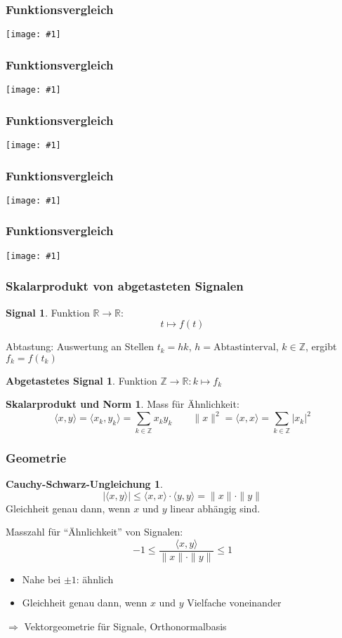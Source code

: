 %
%
%



\theoremstyle{definition}
\newtheorem{signal}{Signal}
\newtheorem{abgetastet}{Abgetastetes Signal}
\newtheorem{skalar}{Skalarprodukt und Norm}
\newtheorem{cauchyschwarz}{Cauchy-Schwarz-Ungleichung}
\newtheorem{nachteile}{Nachteile}
\newtheorem{idee}{Idee}
\newtheorem{faktoren}{Erfolgsfaktoren}


%
%
\def\vergleich#1{
\begin{frame}
\frametitle{Funktionsvergleich}
\centering
\texttt{[image: \#1]}
\end{frame}
}

\vergleich{../../buch/chapters/1-geometrie/images/sinsin.pdf}
\vergleich{../../buch/chapters/1-geometrie/images/sincos.pdf}
\vergleich{../../buch/chapters/1-geometrie/images/sinrect.pdf}
\vergleich{../../buch/chapters/1-geometrie/images/cosrect.pdf}
\vergleich{../../buch/chapters/1-geometrie/images/sinrand.pdf}

\begin{frame}
\frametitle{Skalarprodukt von abgetasteten Signalen}
\begin{signal}
Funktion $\mathbb R \to \mathbb R$:
\[
t\mapsto f(t)
\]
\end{signal}

Abtastung: Auswertung an Stellen $t_k = hk$, $h=\text{Abtastinterval}$,
$k\in\mathbb Z$, ergibt $f_k=f(t_k)$

\begin{abgetastet}
Funktion $\mathbb Z\to \mathbb R: k\mapsto f_k $
\end{abgetastet}

\begin{skalar}
Mass für Ähnlichkeit:
\[
\langle x,y\rangle
=
\langle x_k, y_k \rangle
=
\sum_{k\in\mathbb Z} x_ky_k
\qquad
\|x\|^2 = \langle x,x\rangle = \sum_{k\in\mathbb Z} |x_k|^2
\]
\end{skalar}

\end{frame}

%
%
\begin{frame}
\frametitle{Geometrie}
\begin{cauchyschwarz}
\[
|\langle x,y\rangle| \le \langle x,x\rangle \cdot \langle y,y\rangle
= \|x\|\cdot \|y\|
\]
Gleichheit genau dann, wenn $x$ und $y$ linear abhängig sind.
\end{cauchyschwarz}
Masszahl für ``Ähnlichkeit'' von Signalen:
\[
-1 \le \frac{\langle x,y\rangle}{\|x\|\cdot \|y\|}\le 1
\]
\begin{itemize}
\item
Nahe bei $\pm 1$: ähnlich
\item
Gleichheit genau dann, wenn $x$ und $y$ Vielfache voneinander
\end{itemize}
$\Rightarrow$ Vektorgeometrie für Signale, Orthonormalbasis
\end{frame}

